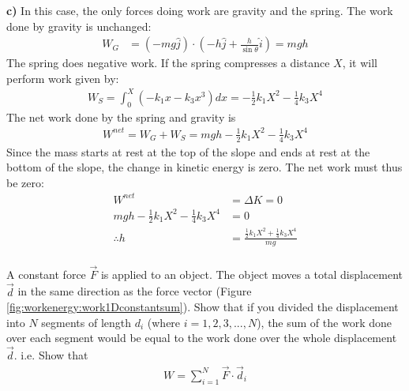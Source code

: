 \begin{solution}
\textbf{c)} In this case, the only forces doing work are gravity and the spring. The work done by gravity is unchanged:
\begin{align*}
W_G &= (-mg\hat j)\cdot(-h\hat j+\frac{h}{\sin\theta}\hat i)=mgh
\end{align*}
The spring does negative work. If the spring compresses a distance $X$, it will perform work given by:
\begin{align}
W_S=\int_0^X (-k_1x-k_3x^3)dx=-\frac{1}{2}k_1X^2-\frac{1}{4}k_3X^4
\end{align}
The net work done by the spring and gravity is
\begin{align*}
W^{net}=W_G+W_S=mgh-\frac{1}{2}k_1X^2-\frac{1}{4}k_3X^4
\end{align*}
Since the mass starts at rest at the top of the slope and ends at rest at the bottom of the slope, the change in kinetic energy is zero. The net work must thus be zero:
\begin{align*}
W^{net} &= \Delta K=0\\
mgh-\frac{1}{2}k_1X^2-\frac{1}{4}k_3X^4&=0\\
\therefore h&=\frac{\frac{1}{2}k_1X^2+\frac{1}{4}k_3X^4}{mg}\\
\end{align*}


\end{solution}

\question A constant force $\vec F$ is applied to an object. The object moves a total displacement $\vec d$ in the same direction as the force vector (Figure \ref{fig:workenergy:work1Dconstantsum}). 
Show that if you divided the displacement into $N$ segments of length $d_i$ (where $i=1,2,3,...,N$), the sum of the work done over each segment would be equal to the work done over the whole displacement $\vec d$. i.e. Show that
\begin{align*}
W=\sum_{i=1}^{N}\vec F \cdot \vec d_i
\end{align*}


